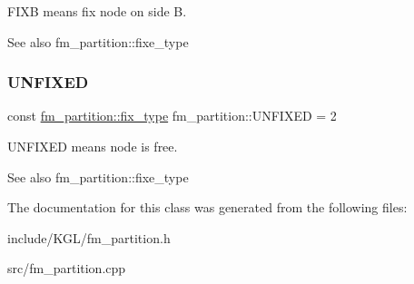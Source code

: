 {\ttfamily F\+I\+XB} means fix node on side {\ttfamily B}.

\begin{DoxySeeAlso}{See also}
fm\+\_\+partition\+::fixe\+\_\+type 
\end{DoxySeeAlso}
\mbox{\label{classfm__partition_a24447561db0ea633212c597c5e1fca56}} 
\subsubsection{\texorpdfstring{U\+N\+F\+I\+X\+ED}{UNFIXED}}
{\footnotesize\ttfamily const \mbox{\hyperlink{classfm__partition_a63693cd93d587dca3d1842f831cd1c55}{fm\+\_\+partition\+::fix\+\_\+type}} fm\+\_\+partition\+::\+U\+N\+F\+I\+X\+ED = 2\hspace{0.3cm}{\ttfamily [static]}}

{\ttfamily U\+N\+F\+I\+X\+ED} means node is free.

\begin{DoxySeeAlso}{See also}
fm\+\_\+partition\+::fixe\+\_\+type 
\end{DoxySeeAlso}


The documentation for this class was generated from the following files\+:\begin{DoxyCompactItemize}
\item 
include/\+K\+G\+L/fm\+\_\+partition.\+h\item 
src/fm\+\_\+partition.\+cpp\end{DoxyCompactItemize}

